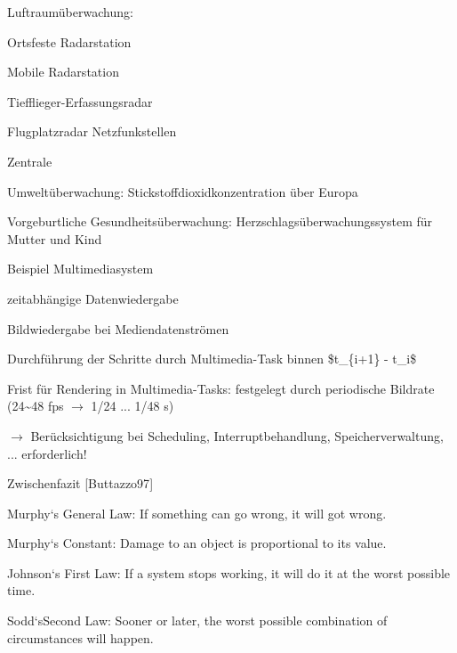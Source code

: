 \documentclass[a4paper]{article}
\begin{document}
\begin{multicols}{3}
    \begin{itemize*}
        \item
        Luftraumüberwachung:
        \begin{itemize*}
            \item Ortsfeste Radarstation
            \item Mobile Radarstation
            \item Tiefflieger-Erfassungsradar
            \item Flugplatzradar Netzfunkstellen
            \item Zentrale
        \end{itemize*}
        \item
        Umweltüberwachung: Stickstoffdioxidkonzentration über Europa
        \item
        Vorgeburtliche Gesundheitsüberwachung: Herzschlagsüberwachungssystem
        für Mutter und Kind
    \end{itemize*}

    Beispiel Multimediasystem

    \begin{itemize*}
        \item
        zeitabhängige Datenwiedergabe
        \item
        Bildwiedergabe bei Mediendatenströmen
        \item
        Durchführung der Schritte durch Multimedia-Task binnen \$t\_\{i+1\} -
        t\_i\$
        \item
        Frist für Rendering in Multimedia-Tasks: festgelegt durch periodische
        Bildrate (24\textasciitilde48 fps $\rightarrow$  1/24
        ... 1/48 s)
        \item
        $\rightarrow$  Berücksichtigung bei Scheduling,
        Interruptbehandlung, Speicherverwaltung, ... erforderlich!
    \end{itemize*}

    Zwischenfazit {[}Buttazzo97{]}

    \begin{itemize*}
        \item
        Murphy`s General Law: If something can go wrong, it will got wrong.
        \item
        Murphy`s Constant: Damage to an object is proportional to its value.
        \item
        Johnson`s First Law: If a system stops working, it will do it at the
        worst possible time.
        \item
        Sodd`sSecond Law: Sooner or later, the worst possible combination of
        circumstances will happen.
    \end{itemize*}


\end{multicols}
\end{document}
